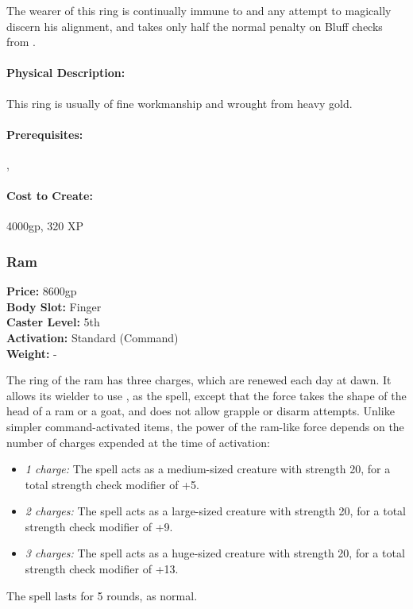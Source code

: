 The wearer of this ring is continually immune to  and any attempt to magically discern his alignment, and takes only half the normal penalty on Bluff checks from .

\paragraph{Physical Description:} This ring is usually of fine workmanship and wrought from heavy gold.

\paragraph{Prerequisites:} , 

\paragraph{Cost to Create:} 4000gp, 320 XP
\subsubsection{Ram}
\label{Item:Ram}
   \textbf{Price:} 8600gp
\\ \textbf{Body Slot:} Finger
\\ \textbf{Caster Level:} 5th
\\ \textbf{Activation:} Standard (Command)
\\ \textbf{Weight:} -

The ring of the ram has three charges, which are renewed each day at dawn. It allows its wielder to use , as the spell, except that the force takes the shape of the head of a ram or a goat, and does not allow grapple or disarm attempts. Unlike simpler command-activated items, the power of the ram-like force depends on the number of charges expended at the time of activation:
\begin{itemize}
\item \emph{1 charge:} The spell acts as a medium-sized creature with strength 20, for a total strength check modifier of +5.
\item \emph{2 charges:} The spell acts as a large-sized creature with strength 20, for a total strength check modifier of +9.
\item \emph{3 charges:} The spell acts as a huge-sized creature with strength 20, for a total strength check modifier of +13.
\end{itemize}
The spell lasts for 5 rounds, as normal.

